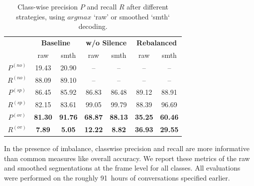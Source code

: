 \documentclass[a4paper]{article}
\begin{document}
\begin{table}[t]
  \caption{Class-wise precision $P$ and recall $R$ after different strategies, using $argmax$ `raw' or smoothed `smth` decoding.}
  \centering
  \begin{tabular}{ccccccc}
    \toprule
                & \multicolumn{2}{c}{\textbf{Baseline}}  & \multicolumn{2}{c}{\textbf{w/o Silence}}   & \multicolumn{2}{c}{\textbf{Rebalanced}}   \\
                &         raw      &         smth        &         raw      &         smth            &         raw      &         smth           \\ \midrule
    $P^{(no)}$  &         19.43    &         20.90       &         --       &         --              &         --       &         --             \\
    $R^{(no)}$  &         88.09    &         89.10       &         --       &         --              &         --       &         --             \\ \midrule
    $P^{(sp)}$  &         86.45    &         85.92       &         86.83    &         86.48           &         89.12    &         88.91          \\
    $R^{(sp)}$  &         82.15    &         83.61       &         99.05    &         99.79           &         88.39    &         96.69          \\ \midrule
    $P^{(ov)}$  & \textbf{81.30}   & \textbf{91.76}      & \textbf{68.87}   & \textbf{88.13}          & \textbf{35.25}   & \textbf{60.46}         \\
    $R^{(ov)}$  & \textbf{ 7.89}   & \textbf{ 5.05}      & \textbf{12.22}   & \textbf{ 8.82}          & \textbf{36.93}   & \textbf{29.55}         \\
    \bottomrule
  \end{tabular}
  \label{tbl:results}
  \vspace*{-\baselineskip}
\end{table}

In the presence of imbalance, classwise precision and recall are more informative than common measures like overall accuracy.
We report these metrics of the raw and smoothed segmentations at the frame level for all classes.
All evaluations were performed on the roughly 91~hours of conversations specified earlier.
\end{document}
